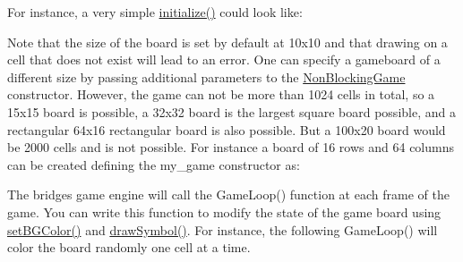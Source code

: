 For instance, a very simple \mbox{\hyperlink{classbridges_1_1game_1_1_game_base_a9b6eb6fa7fceaac09d204b549164037f}{initialize()}} could look like\+: 
\begin{DoxyCode}{0}
\DoxyCodeLine{\}}
\end{DoxyCode}


Note that the size of the board is set by default at 10x10 and that drawing on a cell that does not exist will lead to an error. One can specify a gameboard of a different size by passing additional parameters to the \mbox{\hyperlink{classbridges_1_1game_1_1_non_blocking_game}{Non\+Blocking\+Game}} constructor. However, the game can not be more than 1024 cells in total, so a 15x15 board is possible, a 32x32 board is the largest square board possible, and a rectangular 64x16 rectangular board is also possible. But a 100x20 board would be 2000 cells and is not possible. For instance a board of 16 rows and 64 columns can be created defining the my\+\_\+game constructor as\+:


\begin{DoxyCode}{0}
\end{DoxyCode}


The bridges game engine will call the Game\+Loop() function at each frame of the game. You can write this function to modify the state of the game board using \mbox{\hyperlink{classbridges_1_1game_1_1_game_base_ab667bbca1c81e5fb3aa8d81d70fe8cd2}{set\+B\+G\+Color()}} and \mbox{\hyperlink{classbridges_1_1game_1_1_game_base_a415fa8f70bef364dfa966f2a86048901}{draw\+Symbol()}}. For instance, the following Game\+Loop() will color the board randomly one cell at a time.


